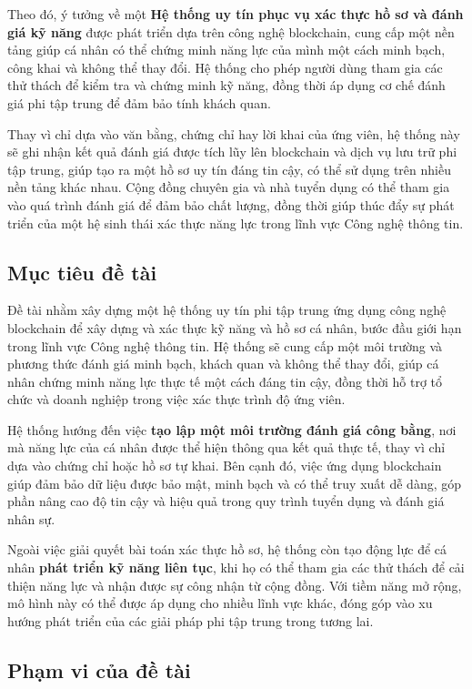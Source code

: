 Theo đó, ý tưởng về một \textbf{Hệ thống uy tín phục vụ xác thực hồ sơ và đánh giá kỹ năng} được phát triển dựa trên công nghệ blockchain,
cung cấp một nền tảng giúp cá nhân có thể chứng minh năng lực của mình một cách minh bạch, công khai và không thể thay đổi.
Hệ thống cho phép người dùng tham gia các thử thách để kiểm tra và chứng minh kỹ năng, đồng thời áp dụng cơ chế đánh giá phi tập trung để đảm bảo tính khách quan.

Thay vì chỉ dựa vào văn bằng, chứng chỉ hay lời khai của ứng viên, hệ thống này sẽ ghi nhận kết quả đánh giá được tích lũy lên blockchain và dịch vụ lưu trữ phi tập trung,
giúp tạo ra một hồ sơ uy tín đáng tin cậy, có thể sử dụng trên nhiều nền tảng khác nhau.
Cộng đồng chuyên gia và nhà tuyển dụng có thể tham gia vào quá trình đánh giá để đảm bảo chất lượng,
đồng thời giúp thúc đẩy sự phát triển của một hệ sinh thái xác thực năng lực trong lĩnh vực Công nghệ thông tin.

\subsection{Mục tiêu đề tài}

Đề tài nhằm xây dựng một hệ thống uy tín phi tập trung ứng dụng công nghệ blockchain để xây dựng và xác thực kỹ năng và hồ sơ cá nhân, bước đầu giới hạn trong lĩnh vực Công nghệ thông tin.
Hệ thống sẽ cung cấp một môi trường và phương thức đánh giá minh bạch, khách quan và không thể thay đổi, giúp cá nhân chứng minh năng lực thực tế một cách đáng tin cậy,
đồng thời hỗ trợ tổ chức và doanh nghiệp trong việc xác thực trình độ ứng viên.

Hệ thống hướng đến việc \textbf{tạo lập một môi trường đánh giá công bằng}, nơi mà năng lực của cá nhân được thể hiện thông qua kết quả thực tế,
thay vì chỉ dựa vào chứng chỉ hoặc hồ sơ tự khai. Bên cạnh đó, việc ứng dụng blockchain giúp đảm bảo dữ liệu được bảo mật,
minh bạch và có thể truy xuất dễ dàng, góp phần nâng cao độ tin cậy và hiệu quả trong quy trình tuyển dụng và đánh giá nhân sự.

Ngoài việc giải quyết bài toán xác thực hồ sơ, hệ thống còn tạo động lực để cá nhân \textbf{phát triển kỹ năng liên tục}, khi họ có thể tham gia các thử thách
để cải thiện năng lực và nhận được sự công nhận từ cộng đồng. Với tiềm năng mở rộng, mô hình này có thể được áp dụng cho nhiều lĩnh vực khác,
đóng góp vào xu hướng phát triển của các giải pháp phi tập trung trong tương lai.

\subsection{Phạm vi của đề tài}

